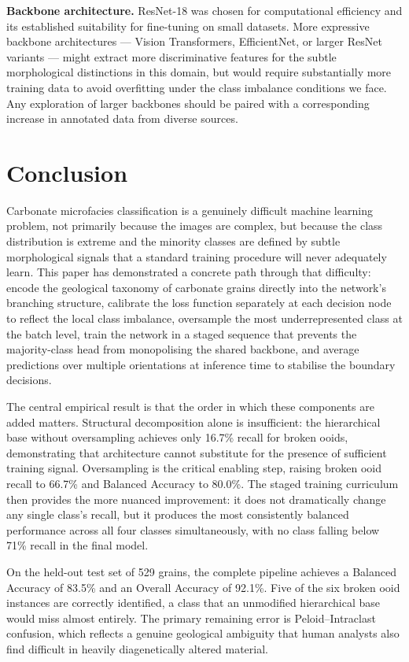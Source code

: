 \documentclass[a4paper,fleqn]{cas-dc}
\begin{document}
\textbf{Backbone architecture.} ResNet-18 was chosen for computational efficiency and its established suitability for fine-tuning on small datasets. More expressive backbone architectures --- Vision Transformers, EfficientNet, or larger ResNet variants --- might extract more discriminative features for the subtle morphological distinctions in this domain, but would require substantially more training data to avoid overfitting under the class imbalance conditions we face. Any exploration of larger backbones should be paired with a corresponding increase in annotated data from diverse sources.

\section{Conclusion}

Carbonate microfacies classification is a genuinely difficult machine learning problem, not primarily because the images are complex, but because the class distribution is extreme and the minority classes are defined by subtle morphological signals that a standard training procedure will never adequately learn. This paper has demonstrated a concrete path through that difficulty: encode the geological taxonomy of carbonate grains directly into the network's branching structure, calibrate the loss function separately at each decision node to reflect the local class imbalance, oversample the most underrepresented class at the batch level, train the network in a staged sequence that prevents the majority-class head from monopolising the shared backbone, and average predictions over multiple orientations at inference time to stabilise the boundary decisions.

The central empirical result is that the order in which these components are added matters. Structural decomposition alone is insufficient: the hierarchical base without oversampling achieves only 16.7\% recall for broken ooids, demonstrating that architecture cannot substitute for the presence of sufficient training signal. Oversampling is the critical enabling step, raising broken ooid recall to 66.7\% and Balanced Accuracy to 80.0\%. The staged training curriculum then provides the more nuanced improvement: it does not dramatically change any single class's recall, but it produces the most consistently balanced performance across all four classes simultaneously, with no class falling below 71\% recall in the final model.

On the held-out test set of 529 grains, the complete pipeline achieves a Balanced Accuracy of 83.5\% and an Overall Accuracy of 92.1\%. Five of the six broken ooid instances are correctly identified, a class that an unmodified hierarchical base would miss almost entirely. The primary remaining error is Peloid--Intraclast confusion, which reflects a genuine geological ambiguity that human analysts also find difficult in heavily diagenetically altered material.
\end{document}
